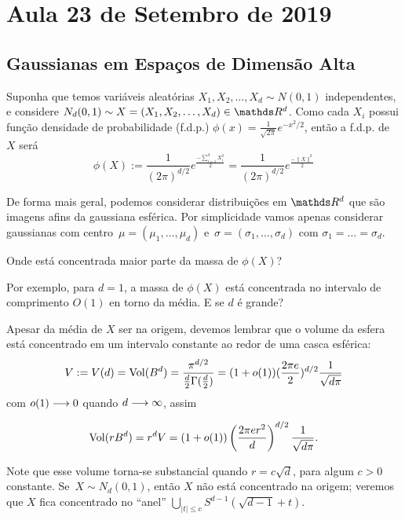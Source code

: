\section{Aula 23 de Setembro de 2019}
\label{2019_09_23}

\subsection{Gaussianas em Espaços de Dimensão Alta}

Suponha que temos variáveis aleatórias ${ X_1, X_2, \dots, X_d \sim N(0,1)}$
independentes, e considere $N_d(0,1) \sim X = (X_1, X_2, \dots, X_d) \in \RR^d$.
Como cada $X_i$ possui função densidade de probabilidade (f.d.p.) 
$\phi(x) = \frac{1}{\sqrt{2\pi}}e^{-x^2/2}$, então a f.d.p. de $X$ será
\begin{equation*}\label{key}
\phi(X) := \frac{1}{(2\pi)^{d/2}}e^{\frac{-\sum_{i = 1}^{d}{X_i^2}}{2}}
= \frac{1}{(2\pi)^{d/2}}e^{\frac{-\|X\|^2}{2}}
\end{equation*}

De forma mais geral, podemos considerar distribuições em $\RR^d$ que são
imagens afins da gaussiana esférica. Por simplicidade vamos apenas considerar
gaussianas com centro~${\mu = (\mu_1, \dots, \mu_d)}$ 
e~$\sigma = (\sigma_1, \dots, \sigma_d)$ com $\sigma_1 = \dots = \sigma_d$.

\begin{pergunta}
	Onde está concentrada maior parte da massa de $\phi(X)$?
\end{pergunta}
Por exemplo, para $d = 1$, a massa de $\phi(X)$ está concentrada no intervalo
de comprimento $O(1)$ en torno da média. E se $d$ é grande?

Apesar da média de $X$ ser na origem, devemos lembrar que o volume da esfera
está concentrado em um intervalo constante ao redor de uma casca esférica:
\begin{equation*}\label{key}
V := V(d) = \operatorname{Vol}(B^d) = \frac{\pi^{d/2}}{\frac{d}{2}\Gamma(\frac{d}{2})} 
   = (1 + o(1))(\frac{2\pi e}{2})^{d/2}\frac{1}{\sqrt{d\pi}}
\end{equation*}
com  $o(1)\longrightarrow 0$  quando $d\longrightarrow \infty$, assim

\begin{equation*}\label{key}
\operatorname{Vol} (rB^d) = r^d V 
= (1 + o(1))\left(\frac{2\pi e r^2}{d}\right)^{d/2}\frac{1}{\sqrt{d\pi}}.
\end{equation*}

Note que esse volume torna-se substancial quando $r = c\sqrt{d}$, para algum 
$c>0$ constante. Se~$X\sim N_d(0,1)$, então $X$ não está concentrado na
origem; veremos que $X$ fica concentrado no ``anel'' 
$\bigcup_{|t|\leq c}S^{d-1}(\sqrt{d-1} + t)$.

